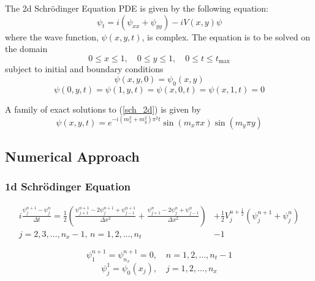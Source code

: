 \documentclass[10pt]{article}
\begin{document}
The 2d Schrödinger Equation PDE is given by the following equation:
\begin{equation}\label{sch_2d}
\psi_t = i(\psi_{xx} + \psi_{yy}) - iV(x,y)\psi
\end{equation}
where the wave function, $\psi(x,y,t)$, is complex. The equation is to be solved on the domain
$$0\leq x \leq 1, \quad 0 \leq y \leq 1, \quad 0\leq t \leq t_{\textrm{max}}$$
subject to initial and boundary conditions
\begin{equation}\label{sch_2d_IC}
\psi(x,y,0) = \psi_0(x,y)
\end{equation}
\begin{equation}\label{sch_2_BC}
\psi(0,y,t) = \psi(1,y,t) = \psi(x,0,t) = \psi(x,1,t) = 0
\end{equation}

A family of exact solutions to (\ref{sch_2d}) is given by
\begin{equation}\label{2d_exact_soln}
\psi(x,y,t) = e^{-i (m_x^2 + m_y^2) \pi^2 t} \sin(m_x \pi x) \sin(m_y \pi y)
\end{equation}

\subsection*{Numerical Approach}

\subsubsection*{1d Schrödinger Equation}


\begin{align}\label{CN}
i \frac{\psi_j^{n+1} - \psi_j^n}{\Delta t} = \frac{1}{2} \left( 
\frac{\psi_{j+1}^{n+1} - 2\psi_j^{n+1} + \psi_{j-1}^{n+1}}{\Delta x^2} 
+ \frac{\psi_{j+1}^n - 2\psi_j^n + \psi_{j-1}^n}{\Delta x^2} \right)
&+ \frac{1}{2} V_j^{n+\frac{1}{2}} \left(\psi_j^{n+1} + \psi_j^n \right) \nonumber \\
j = 2, 3, \dots, n_x - 1, \, n = 1, 2, \dots, n_t &- 1
\end{align}

$$\psi_1^{n+1} = \psi_{n_x}^{n+1} = 0, \quad n = 1, 2, \dots, n_t - 1$$
$$\psi_j^1 = \psi_0(x_j), \quad j = 1, 2, \dots, n_x$$
\end{document}
